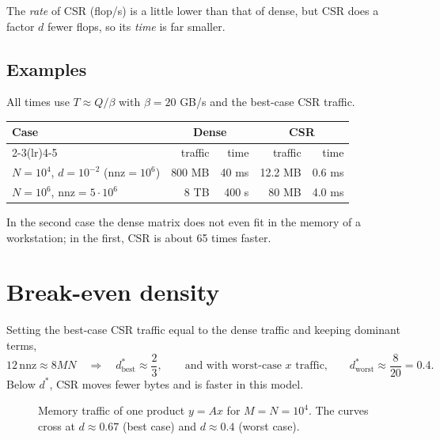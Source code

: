 \documentclass[11pt,a4paper]{article}
\newcommand{\nnz}{\mathrm{nnz}}
\begin{document}
\noindent The \emph{rate} of CSR (flop/s) is a little lower than that of dense,
but CSR does a factor $d$ fewer flops, so its \emph{time} is far smaller.

\subsection{Examples}

All times use $T \approx Q / \beta$ with $\beta = 20$ GB/s and the best-case
CSR traffic.

\begin{center}
\begin{tabular}{lrrrr}
\toprule
Case & \multicolumn{2}{c}{Dense} & \multicolumn{2}{c}{CSR} \\
\cmidrule(lr){2-3}\cmidrule(lr){4-5}
 & traffic & time & traffic & time \\
\midrule
$N = 10^4$, $d = 10^{-2}$ ($\nnz = 10^6$) & 800 MB & 40 ms & 12.2 MB & 0.6 ms \\
$N = 10^6$, $\nnz = 5\cdot 10^6$ & 8 TB & 400 s & 80 MB & 4.0 ms \\
\bottomrule
\end{tabular}
\end{center}

\noindent In the second case the dense matrix does not even fit in the memory
of a workstation; in the first, CSR is about 65 times faster.

\section{Break-even density}
\label{sec:breakeven}

Setting the best-case CSR traffic equal to the dense traffic and keeping
dominant terms,
\[
  12\,\nnz \approx 8MN
  \quad\Longrightarrow\quad
  d^{*}_{\text{best}} \approx \frac{2}{3},
  \qquad\text{and with worst-case $x$ traffic,}\qquad
  d^{*}_{\text{worst}} \approx \frac{8}{20} = 0.4 .
\]
Below $d^*$, CSR moves fewer bytes and is faster in this model.

\begin{figure}[H]
\centering
{}
\caption{Memory traffic of one product $y = Ax$ for $M = N = 10^4$. The curves
cross at $d \approx 0.67$ (best case) and $d \approx 0.4$ (worst case).}
\label{fig:breakeven}
\end{figure}
\end{document}
